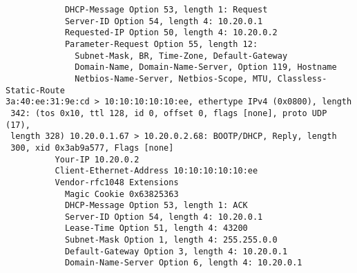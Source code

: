 \documentclass[a4paper,12pt]{article}
\begin{document}
\begin{lstlisting}
            DHCP-Message Option 53, length 1: Request
            Server-ID Option 54, length 4: 10.20.0.1
            Requested-IP Option 50, length 4: 10.20.0.2
            Parameter-Request Option 55, length 12: 
              Subnet-Mask, BR, Time-Zone, Default-Gateway
              Domain-Name, Domain-Name-Server, Option 119, Hostname
              Netbios-Name-Server, Netbios-Scope, MTU, Classless-Static-Route
3a:40:ee:31:9e:cd > 10:10:10:10:10:ee, ethertype IPv4 (0x0800), length
 342: (tos 0x10, ttl 128, id 0, offset 0, flags [none], proto UDP (17),
 length 328) 10.20.0.1.67 > 10.20.0.2.68: BOOTP/DHCP, Reply, length
 300, xid 0x3ab9a577, Flags [none]
          Your-IP 10.20.0.2
          Client-Ethernet-Address 10:10:10:10:10:ee
          Vendor-rfc1048 Extensions
            Magic Cookie 0x63825363
            DHCP-Message Option 53, length 1: ACK
            Server-ID Option 54, length 4: 10.20.0.1
            Lease-Time Option 51, length 4: 43200
            Subnet-Mask Option 1, length 4: 255.255.0.0
            Default-Gateway Option 3, length 4: 10.20.0.1
            Domain-Name-Server Option 6, length 4: 10.20.0.1
\end{lstlisting}
\end{document}
